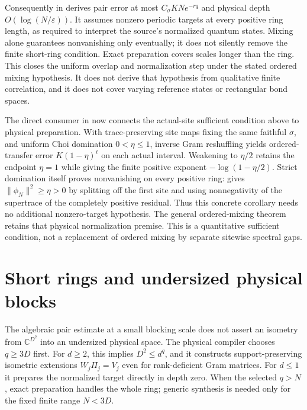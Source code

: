 \documentclass{article}
\begin{document}
Consequently
in 
derives pair error at most $C_\sigma KN e^{-rq}$ and physical depth
$O(\log(N/\varepsilon))$. It assumes nonzero periodic targets at every
positive ring length, as required to interpret the source's normalized
quantum states. Mixing alone guarantees nonvanishing only eventually;
it does not silently remove the finite short-ring condition. Exact
preparation covers scales longer than the ring. This closes the uniform
overlap and normalization step under the stated ordered mixing hypothesis.
It does not derive that hypothesis from qualitative finite correlation,
and it does not cover varying reference states or rectangular bond spaces.

The direct consumer
in 
now connects the actual-site sufficient condition above to physical
preparation. With trace-preserving site maps fixing the same faithful
$\sigma$, and uniform Choi domination $0<\eta\le1$, inverse Gram
reshuffling yields ordered-transfer error $K(1-\eta)^{\ell}$ on each
actual interval. Weakening to $\eta/2$ retains the endpoint $\eta=1$
while giving the finite positive exponent $-\log(1-\eta/2)$.
Strict domination itself proves nonvanishing on every positive ring:
gives $\|\phi_N\|^2\ge\eta>0$ by splitting off the first site and
using nonnegativity of the supertrace of the completely positive residual.
Thus this concrete corollary needs no additional nonzero-target hypothesis.
The general ordered-mixing theorem retains that physical normalization
premise. This is a quantitative sufficient condition, not a replacement
of ordered mixing by separate sitewise spectral gaps.

\section{Short rings and undersized physical blocks}
The algebraic pair estimate at a small blocking scale does not assert an
isometry from $\mathbb C^{D^2}$ into an undersized physical space.
The physical compiler chooses $q\ge3D$ first. For $d\ge2$, this implies
$D^2\le d^q$, and it constructs support-preserving isometric extensions
$W_j\Pi_j=V_j$ even for rank-deficient Gram matrices. For $d\le1$ it
prepares the normalized target directly in depth zero. When the selected
$q>N$, exact preparation handles the whole ring; generic synthesis is
needed only for the fixed finite range $N<3D$.
\end{document}
